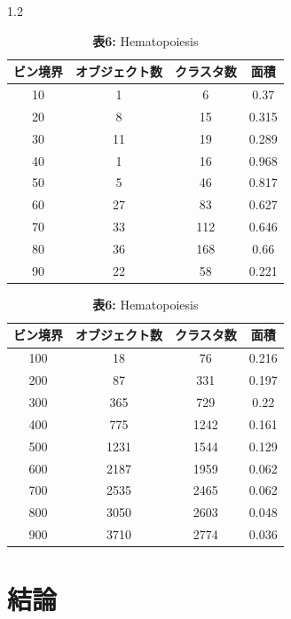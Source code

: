 \documentclass[dvipdfmx,11pt]{kuisthesis}
\begin{document}
\begin{spacing}{1.2}
\begin{table}[h]
\begin{minipage}[b]{0.49\columnwidth}
\begin{tabular}{|c|c|c|c|}
    \hline
    \textbf{ビン境界} & \textbf{オブジェクト数} & \textbf{クラスタ数} & \textbf{面積} \\
    \hline
    10  & 1  & 6   & 0.37  \\
    20  & 8  & 15  & 0.315 \\
    30  & 11 & 19  & 0.289 \\
    40  & 1  & 16  & 0.968 \\
    50  & 5  & 46  & 0.817 \\
    60  & 27 & 83  & 0.627 \\
    70  & 33 & 112 & 0.646 \\
    80  & 36 & 168 & 0.66  \\
    90  & 22 & 58  & 0.221 \\
    \hline
    \end{tabular}
    \caption{\textbf{表5:} Hematopoiesis}
  \end{minipage}
  \begin{minipage}[b]{0.49\columnwidth}
    \centering
    \scriptsize %
    \begin{tabular}{|c|c|c|c|}
    \hline
    \textbf{ビン境界} & \textbf{オブジェクト数} & \textbf{クラスタ数} & \textbf{面積} \\
    \hline
    100  & 18   & 76    & 0.216 \\
    200  & 87   & 331   & 0.197 \\
    300  & 365  & 729   & 0.22  \\
    400  & 775  & 1242  & 0.161 \\
    500  & 1231 & 1544  & 0.129 \\
    600  & 2187 & 1959  & 0.062 \\
    700  & 2535 & 2465  & 0.062 \\
    800  & 3050 & 2603  & 0.048 \\
    900  & 3710 & 2774  & 0.036 \\
    \hline
    \end{tabular}
    \caption{\textbf{表6:} Hematopoiesis}
  \end{minipage}
\end{table}

\newpage
\section{結論}\label{c-11}


\end{spacing}
\end{document}
